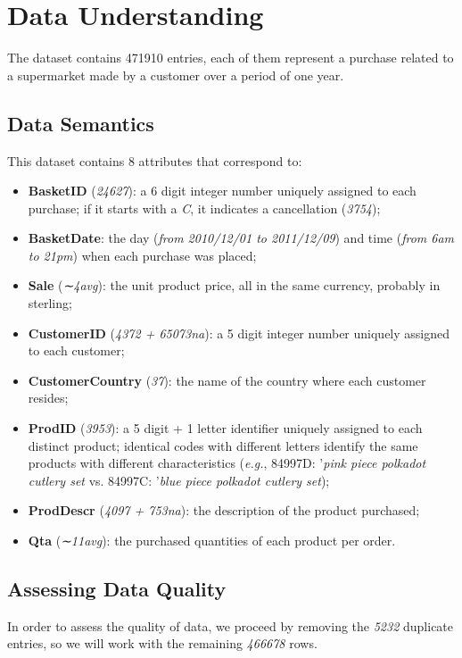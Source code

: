 \section{Data Understanding}

The dataset contains 471910 entries, each of them represent a purchase related to a supermarket made by a customer over a period of one year.

\subsection{Data Semantics}

This dataset contains 8 attributes that correspond to:

\begin{itemize}
\item \textbf{BasketID} (\textit{24627}): a 6 digit integer number uniquely assigned to each purchase; if it starts with a \textit{C}, it indicates a cancellation (\textit{3754});
\item \textbf{BasketDate}: the day (\textit{from 2010/12/01 to 2011/12/09}) and time (\textit{from 6am to 21pm}) when each purchase was placed;
\item \textbf{Sale} (\textit{∼4avg}): the unit product price, all in the same currency, probably in sterling;
\item \textbf{CustomerID} (\textit{4372 + 65073na}): a 5 digit integer number uniquely assigned to each customer;
\item \textbf{CustomerCountry} (\textit{37}): the name of the country where each customer resides;
\item \textbf{ProdID} (\textit{3953}): a 5 digit + 1 letter identifier uniquely assigned to each distinct product; identical codes with different letters identify the same products with different characteristics (\emph{e.g.}, 84997D: '\emph{pink piece polkadot cutlery set} vs. 84997C: '\emph{blue piece polkadot cutlery set});
\item \textbf{ProdDescr} (\textit{4097 + 753na}): the description of the product purchased;
\item \textbf{Qta} (\textit{∼11avg}): the purchased quantities of each product per order.
\end{itemize}

\subsection{Assessing Data Quality}
In order to assess the quality of data, we proceed by removing the \textit{5232} duplicate entries, so we will work with the remaining \textit{466678} rows.

